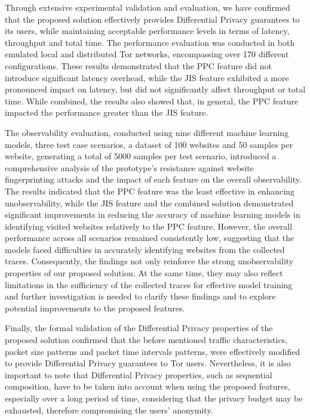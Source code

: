 Through extensive experimental validation and evaluation, we have confirmed that the proposed solution effectively provides Differential Privacy guarantees to its users, while maintaining acceptable performance levels in terms of latency, throughput and total time. The performance evaluation was conducted in both emulated local and distributed Tor networks, encompassing over 170 different configurations. These results demonstrated that the PPC feature did not introduce significant latency overhead, while the JIS feature exhibited a more pronounced impact on latency, but did not significantly affect throughput or total time. While combined, the results also showed that, in general, the PPC feature impacted the performance greater than the JIS feature. 

The observability evaluation, conducted using nine different machine learning models, three test case scenarios, a dataset of 100 websites and 50 samples per website, generating a total of 5000 samples per test scenario, introduced a comprehensive analysis of the prototype's resistance against website fingerprinting attacks and the impact of each feature on the overall observability. The results indicated that the PPC feature was the least effective in enhancing unobservability, while the JIS feature and the combined solution demonstrated significant improvements in reducing the accuracy of machine learning models in identifying visited websites relatively to the PPC feature. However, the overall performance across all scenarios remained consistently low, suggesting that the models faced difficulties in accurately identifying websites from the collected traces. Consequently, the findings not only reinforce the strong unobservability properties of our proposed solution. At the same time, they may also reflect limitations in the sufficiency of the collected traces for effective model training and further investigation is needed to clarify these findings and to explore potential improvements to the proposed features. 

Finally, the formal validation of the Differential Privacy properties of the proposed solution confirmed that the before mentioned traffic characteristics, packet size patterns and packet time intervals patterns, were effectively modified to provide Differential Privacy guarantees to Tor users. Nevertheless, it is also important to note that Differential Privacy properties, such as sequential composition, have to be taken into account when using the proposed features, especially over a long period of time, considering that the privacy budget may be exhausted, therefore compromising the users' anonymity.

